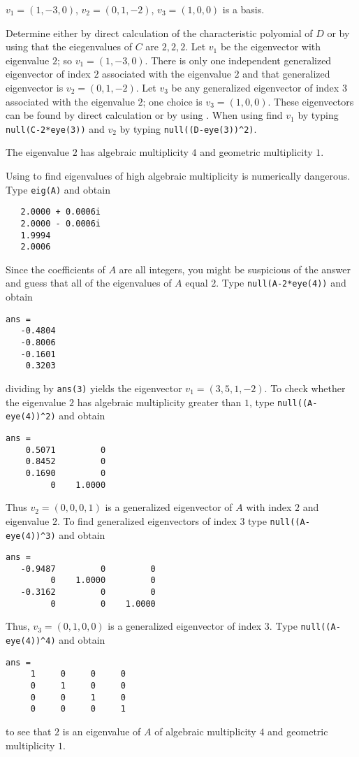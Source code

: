  \ans $v_1=(1,-3,0)$, $v_2=(0,1,-2)$, $v_3=(1,0,0)$ is a basis.

\soln  Determine either by direct calculation of the characteristic polyomial of $D$ 
or by using \Matlab that the eiegenvalues of $C$ are $2,2,2$.  Let $v_1$ be the
eigenvector with eigenvalue $2$; so $v_1=(1,-3,0)$.  There is only one independent 
generalized eigenvector of index $2$ associated with the eigenvalue $2$ and that 
generalized eigenvector is $v_2=(0,1,-2)$.  Let $v_3$ be any generalized eigenvector 
of index $3$ associated with the eigenvalue $2$; one choice is $v_3=(1,0,0)$.  These 
eigenvectors can be found by direct calculation or by using \Matlab.  When using 
\Matlab find $v_1$ by typing {\tt null(C-2*eye(3))} and $v_2$ by typing 
{\tt null((D-eye(3))\^{}2)}.

 \ans The eigenvalue $2$ has algebraic multiplicity $4$ and geometric
multiplicity $1$.

\soln Using \Matlab to find eigenvalues of high algebraic multiplicity is numerically
dangerous. Type {\tt eig(A)} and obtain
\begin{verbatim}
   2.0000 + 0.0006i
   2.0000 - 0.0006i
   1.9994          
   2.0006          
\end{verbatim}
Since the coefficients of $A$ are all integers, you might be suspicious of the answer
and guess that all of the eigenvalues of $A$ equal $2$.  Type {\tt null(A-2*eye(4))}
and obtain
\begin{verbatim}
ans =
   -0.4804
   -0.8006
   -0.1601
    0.3203
\end{verbatim}
dividing by {\tt ans(3)} yields the eigenvector $v_1=(3,5,1,-2)$.  To check whether
the eigenvalue $2$ has algebraic multiplicity greater than $1$, type 
{\tt null((A-eye(4))\^{}2)} and obtain
\begin{verbatim}
ans =
    0.5071         0
    0.8452         0
    0.1690         0
         0    1.0000
\end{verbatim}
Thus $v_2=(0,0,0,1)$ is a generalized eigenvector of $A$ with index $2$ and eigenvalue
$2$.  To find generalized eigenvectors of index $3$ type {\tt null((A-eye(4))\^{}3)} 
and obtain
\begin{verbatim}
ans =
   -0.9487         0         0
         0    1.0000         0
   -0.3162         0         0
         0         0    1.0000
\end{verbatim}
Thus, $v_3=(0,1,0,0)$ is a generalized eigenvector of index $3$.  Type 
{\tt null((A-eye(4))\^{}4)} and obtain
\begin{verbatim}
ans =
     1     0     0     0
     0     1     0     0
     0     0     1     0
     0     0     0     1
\end{verbatim}
to see that $2$ is an eigenvalue of $A$ of algebraic multiplicity $4$ and geometric
multiplicity $1$.  

